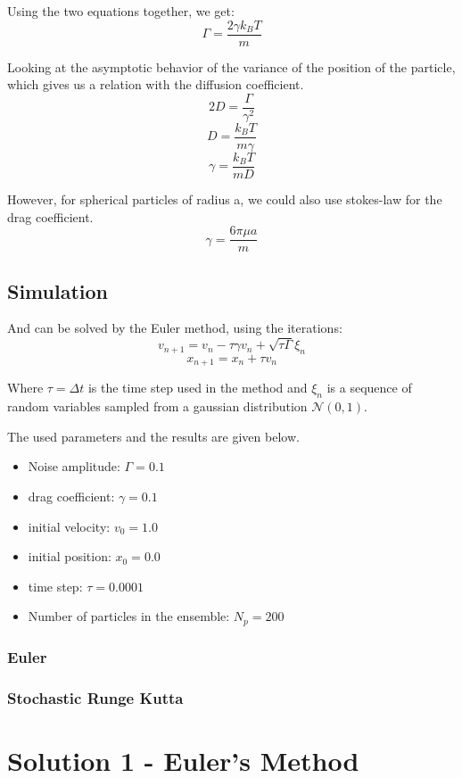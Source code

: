 Using the two equations together, we get:
$$ \boxed{\Gamma = \frac{2\gamma k_{B}T}{m}}$$

Looking at the asymptotic behavior of the variance of the position of the particle, which gives us a relation with the diffusion coefficient.
$$ 2D = \frac{\Gamma}{\gamma^2} $$
$$ D = \frac{k_{B}T}{m\gamma} $$
$$ \boxed{\gamma = \frac{k_{B}T}{mD}} $$

However, for spherical particles of radius a, we could also use stokes-law for the drag coefficient.
$$ \boxed{\gamma = \frac{6\pi \mu a}{m}} $$

\subsection{Simulation}
And can be solved by the Euler method, using the iterations:
$$ \boxed{v_{n+1} = v_{n} - \tau \gamma v_{n} + \sqrt{\tau\Gamma}\xi_{n}} $$
$$\boxed{ x_{n+1} = x_{n} + \tau v_{n} }$$

Where $\tau = \Delta t$ is the time step used in the method and $\xi_{n}$ is a sequence of random variables sampled from a gaussian distribution $\mathcal{N}(0,1)$. \par 
The used parameters and the results are given below.
\begin{itemize}
    \item Noise amplitude: $ \Gamma = 0.1 $
    \item drag coefficient: $ \gamma = 0.1 $
    \item initial velocity: $ v_{0} = 1.0 $
    \item initial position: $ x_{0} = 0.0 $
    \item time step: $ \tau = 0.0001 $
    \item Number of particles in the ensemble: $ N_{p} = 200 $
\end{itemize}

\subsubsection{Euler}

\subsubsection{Stochastic Runge Kutta}




\section{Solution 1 - Euler's Method} 


